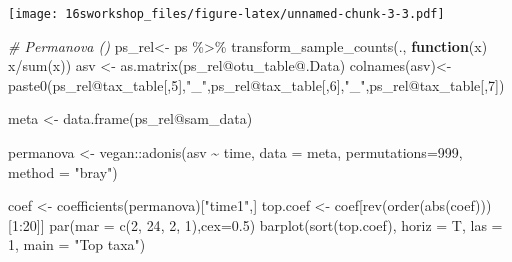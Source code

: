 \documentclass[
]{book}
\newenvironment{Shaded}{\begin{snugshade}}{\end{snugshade}}
\newcommand{\AttributeTok}[1]{\textcolor[rgb]{0.77,0.63,0.00}{#1}}
\newcommand{\CommentTok}[1]{\textcolor[rgb]{0.56,0.35,0.01}{\textit{#1}}}
\newcommand{\ControlFlowTok}[1]{\textcolor[rgb]{0.13,0.29,0.53}{\textbf{#1}}}
\newcommand{\DecValTok}[1]{\textcolor[rgb]{0.00,0.00,0.81}{#1}}
\newcommand{\FloatTok}[1]{\textcolor[rgb]{0.00,0.00,0.81}{#1}}
\newcommand{\FunctionTok}[1]{\textcolor[rgb]{0.00,0.00,0.00}{#1}}
\newcommand{\NormalTok}[1]{#1}
\newcommand{\OtherTok}[1]{\textcolor[rgb]{0.56,0.35,0.01}{#1}}
\newcommand{\SpecialCharTok}[1]{\textcolor[rgb]{0.00,0.00,0.00}{#1}}
\newcommand{\StringTok}[1]{\textcolor[rgb]{0.31,0.60,0.02}{#1}}
\begin{document}
\texttt{[image: 16sworkshop\_files/figure-latex/unnamed-chunk-3-3.pdf]}

\begin{Shaded}
\begin{Highlighting}[]
\CommentTok{\# Permanova ()}
\NormalTok{ps\_rel}\OtherTok{\textless{}{-}}\NormalTok{ ps }\SpecialCharTok{\%\textgreater{}\%} \FunctionTok{transform\_sample\_counts}\NormalTok{(., }\ControlFlowTok{function}\NormalTok{(x) x}\SpecialCharTok{/}\FunctionTok{sum}\NormalTok{(x))}
\NormalTok{asv }\OtherTok{\textless{}{-}} \FunctionTok{as.matrix}\NormalTok{(ps\_rel}\SpecialCharTok{@}\NormalTok{otu\_table}\SpecialCharTok{@}\NormalTok{.Data)}
\FunctionTok{colnames}\NormalTok{(asv)}\OtherTok{\textless{}{-}}\FunctionTok{paste0}\NormalTok{(ps\_rel}\SpecialCharTok{@}\NormalTok{tax\_table[,}\DecValTok{5}\NormalTok{],}\StringTok{"\_"}\NormalTok{,ps\_rel}\SpecialCharTok{@}\NormalTok{tax\_table[,}\DecValTok{6}\NormalTok{],}\StringTok{"\_"}\NormalTok{,ps\_rel}\SpecialCharTok{@}\NormalTok{tax\_table[,}\DecValTok{7}\NormalTok{])}

\NormalTok{meta }\OtherTok{\textless{}{-}} \FunctionTok{data.frame}\NormalTok{(ps\_rel}\SpecialCharTok{@}\NormalTok{sam\_data)}

\NormalTok{permanova }\OtherTok{\textless{}{-}}\NormalTok{ vegan}\SpecialCharTok{::}\FunctionTok{adonis}\NormalTok{(asv }\SpecialCharTok{\textasciitilde{}}\NormalTok{ time,}
               \AttributeTok{data =}\NormalTok{ meta, }\AttributeTok{permutations=}\DecValTok{999}\NormalTok{, }\AttributeTok{method =} \StringTok{"bray"}\NormalTok{)}

\NormalTok{coef }\OtherTok{\textless{}{-}} \FunctionTok{coefficients}\NormalTok{(permanova)[}\StringTok{"time1"}\NormalTok{,]}
\NormalTok{top.coef }\OtherTok{\textless{}{-}}\NormalTok{ coef[}\FunctionTok{rev}\NormalTok{(}\FunctionTok{order}\NormalTok{(}\FunctionTok{abs}\NormalTok{(coef)))[}\DecValTok{1}\SpecialCharTok{:}\DecValTok{20}\NormalTok{]]}
\FunctionTok{par}\NormalTok{(}\AttributeTok{mar =} \FunctionTok{c}\NormalTok{(}\DecValTok{2}\NormalTok{, }\DecValTok{24}\NormalTok{, }\DecValTok{2}\NormalTok{, }\DecValTok{1}\NormalTok{),}\AttributeTok{cex=}\FloatTok{0.5}\NormalTok{)}
\FunctionTok{barplot}\NormalTok{(}\FunctionTok{sort}\NormalTok{(top.coef), }\AttributeTok{horiz =}\NormalTok{ T, }\AttributeTok{las =} \DecValTok{1}\NormalTok{, }\AttributeTok{main =} \StringTok{"Top taxa"}\NormalTok{)}
\end{Highlighting}
\end{Shaded}
\end{document}
